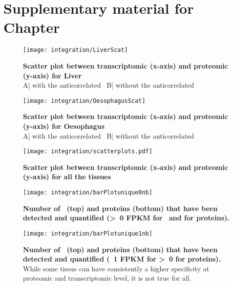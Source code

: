 \chapter{Suppl\texorpdfstring{ementary}{.} material for Chap\texorpdfstring{ter}{.}
}\label{ch:SupplIntegration}


\begin{figure}
    \texttt{[image: integration/LiverScat]}\centering
    \caption[Scatter plot between transcriptomic and proteomic
    for Liver]{\label{fig:ScatterPlotLiver}\textbf{Scatter plot between
    transcriptomic (x-axis) and proteomic (y-axis) for Liver}\\
    A| with the anticorrelated \mRNAs\ B| without the anticorrelated \mRNAs}
\end{figure}


\begin{figure}
\texttt{[image: integration/OesophagusScat]}\centering
    \caption[Scatter plot between transcriptomic and
    proteomic for Oesophagus]{\label{fig:ScatterPlotOesophagus}\textbf{Scatter plot between
    transcriptomic (x-axis) and  proteomic (y-axis) for Oesophagus}\\
    A| with the anticorrelated \mRNAs\ B| without the anticorrelated \mRNAs}
\end{figure}


\begin{figure}
    \texttt{[image: integration/scatterplots.pdf]}\centering
    \caption[Scatter plot between transcriptomic and
    proteomic for all tissues]{\label{fig:ScatterPlotAll}\textbf{Scatter plot between
    transcriptomic (x-axis) and  proteomic (y-axis) for all the tissues}}
\end{figure}


\begin{figure}%
    \texttt{[image: integration/barPlotunique0nb]}\centering
    \caption[Number of \mRNAs\ and proteins detected  only in one
    unique tissue]{\label{fig:barPlotunique0nb}\textbf{Number of
    \mRNAs\ (top) and proteins (bottom)
    that have been detected and quantified (\textgreater\ 0 \gls{FPKM} for \mRNA\
    and for proteins).}}
\end{figure}

\begin{figure}%
    \texttt{[image: integration/barPlotunique1nb]}\centering
    \caption[Number of \mRNAs\ (\geq\ 1 \gls{FPKM})
    and proteins detected (at specific thresholds) only in one unique
    tissue]{\label{fig:barPlotunique1nb}\textbf{Number of
    \mRNAs\ (top) and proteins (bottom)
    that have been detected and quantified (\geq\ 1 \gls{FPKM} for \mRNA\;
    \textgreater\ 0 for proteins).} While some tissue can have consistently a higher
    specificity at proteomic and transcriptomic level, it is not true for all.}
\end{figure}




